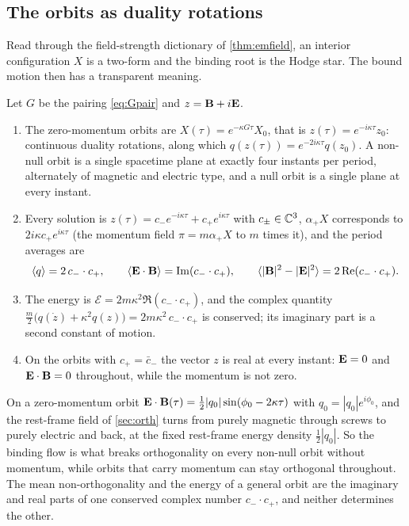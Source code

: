 \subsection{The orbits as duality rotations}

Read through the field-strength dictionary of \cref{thm:emfield}, an interior configuration $X$ is a two-form and the binding root is the
Hodge star. The bound motion then has a transparent meaning.

\begin{proposition}
\label{prop:orbitsEM}
Let $G$ be the pairing \eqref{eq:Gpair} and $z=\mathbf B+i\mathbf E$.
\begin{enumerate}[label=(\roman*),leftmargin=2.2em]
\item The zero-momentum orbits are $X(\tau)=e^{-\kappa G\tau}X_0$, that is $z(\tau)=e^{-i\kappa\tau}z_0$: continuous duality rotations, along which
$q(z(\tau))=e^{-2i\kappa\tau}q(z_0)$. A non-null orbit is a single spacetime plane at exactly four instants per period, alternately of magnetic
and electric type, and a null orbit is a single plane at every instant.
\item Every solution is $z(\tau)=c_-e^{-i\kappa\tau}+c_+e^{i\kappa\tau}$ with $c_\pm\in\mathbb{C}^3$, $\alpha_+X$ corresponds to $2i\kappa c_+e^{i\kappa\tau}$ (the momentum field $\pi=m\alpha_+X$ to $m$ times it), and the
period averages are
\[
\langle q\rangle=2\,c_-\cdot c_+,\qquad \langle\mathbf E\cdot\mathbf B\rangle=\operatorname{Im}(c_-\cdot c_+),\qquad \langle|\mathbf B|^2-|\mathbf E|^2\rangle=2\operatorname{Re}(c_-\cdot c_+).
\]
\item The energy is $\mathcal E=2m\kappa^2\Re(c_-\cdot c_+)$, and the complex quantity $\tfrac m2\bigl(q(\dot z)+\kappa^2q(z)\bigr)=2m\kappa^2\,c_-\cdot c_+$ is
conserved; its imaginary part is a second constant of motion.
\item On the orbits with $c_+=\bar c_-$ the vector $z$ is real at every instant: $\mathbf E=0$ and $\mathbf E\cdot\mathbf B=0$ throughout, while the momentum is not
zero.
\end{enumerate}
\end{proposition}

On a zero-momentum orbit $\mathbf E\cdot\mathbf B(\tau)=\tfrac12|q_0|\sin(\phi_0-2\kappa\tau)$ with $q_0=|q_0|e^{i\phi_0}$, and the rest-frame field of
\cref{sec:orth} turns from purely magnetic through screws to purely electric and back, at the fixed rest-frame energy density
$\tfrac12|q_0|$. So the binding flow is what breaks orthogonality on every non-null orbit without momentum, while orbits that carry momentum
can stay orthogonal throughout. The mean non-orthogonality and the energy of a general orbit are the imaginary and real parts of one conserved
complex number $c_-\cdot c_+$, and neither determines the other.

